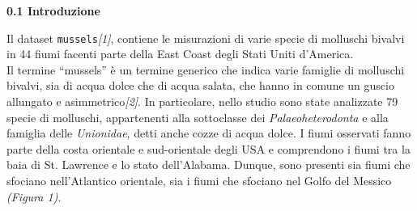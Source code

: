 \documentclass{article} %
\begin{document}
\newpage
\begin{flushleft}
\textbf{\Large 0.1 \: Introduzione}    
\end{flushleft}

Il dataset \texttt{mussels}\textit{[1]}, contiene le misurazioni di varie specie di molluschi bivalvi  in 44 fiumi facenti parte della East Coast degli Stati Uniti d'America.\\ 
Il termine “mussels” è un termine generico che indica varie famiglie di molluschi bivalvi, sia di acqua dolce che di acqua salata, che hanno in comune un guscio allungato e asimmetrico\textit{[2]}. In particolare, nello studio sono state analizzate 79 specie di molluschi, appartenenti alla sottoclasse dei \textit{Palaeoheterodonta} e alla famiglia delle \textit{Unionidae}, detti anche cozze di acqua dolce. 
I fiumi osservati fanno parte della costa orientale e sud-orientale degli USA e comprendono i fiumi tra la baia di St. Lawrence e lo stato dell'Alabama. Dunque, sono presenti sia fiumi che sfociano nell'Atlantico orientale, sia i fiumi che sfociano nel Golfo del Messico \textit{(Figura 1)}. 
\end{document}
